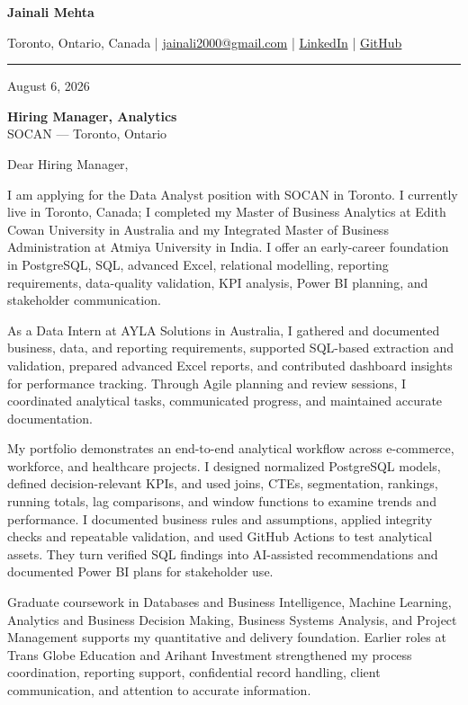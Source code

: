 \documentclass[letterpaper,10pt]{article}
\begin{document}
\begin{center}
  {\fontsize{17}{19}\selectfont\textbf{Jainali Mehta}}\par\vspace{2pt}
  \small Toronto, Ontario, Canada \;|\;
  \href{mailto:jainali2000@gmail.com}{jainali2000@gmail.com} \;|\;
  \href{https://www.linkedin.com/in/jainali-mehta}{LinkedIn} \;|\;
  \href{https://github.com/jainalimehta}{GitHub}
\end{center}
\vspace{-5pt}
\noindent\rule{\textwidth}{0.4pt}

August 6, 2026

\textbf{Hiring Manager, Analytics}\\
SOCAN --- Toronto, Ontario

Dear Hiring Manager,

I am applying for the Data Analyst position with SOCAN in Toronto. I currently live in Toronto, Canada; I completed my Master of Business Analytics at Edith Cowan University in Australia and my Integrated Master of Business Administration at Atmiya University in India. I offer an early-career foundation in PostgreSQL, SQL, advanced Excel, relational modelling, reporting requirements, data-quality validation, KPI analysis, Power BI planning, and stakeholder communication.

As a Data Intern at AYLA Solutions in Australia, I gathered and documented business, data, and reporting requirements, supported SQL-based extraction and validation, prepared advanced Excel reports, and contributed dashboard insights for performance tracking. Through Agile planning and review sessions, I coordinated analytical tasks, communicated progress, and maintained accurate documentation.

My portfolio demonstrates an end-to-end analytical workflow across e-commerce, workforce, and healthcare projects. I designed normalized PostgreSQL models, defined decision-relevant KPIs, and used joins, CTEs, segmentation, rankings, running totals, lag comparisons, and window functions to examine trends and performance. I documented business rules and assumptions, applied integrity checks and repeatable validation, and used GitHub Actions to test analytical assets. They turn verified SQL findings into AI-assisted recommendations and documented Power BI plans for stakeholder use.

Graduate coursework in Databases and Business Intelligence, Machine Learning, Analytics and Business Decision Making, Business Systems Analysis, and Project Management supports my quantitative and delivery foundation. Earlier roles at Trans Globe Education and Arihant Investment strengthened my process coordination, reporting support, confidential record handling, client communication, and attention to accurate information.
\end{document}
